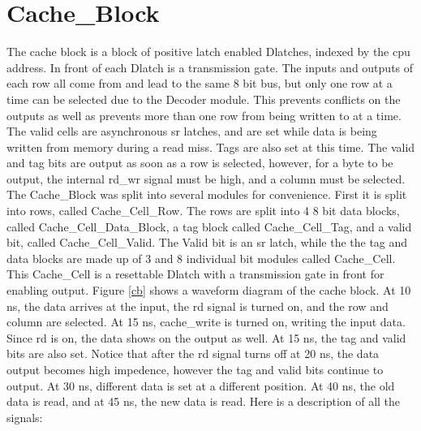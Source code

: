 \documentclass[10pt]{article}
\begin{document}
\section{Cache_Block}
The cache block is a block of positive latch enabled Dlatches, indexed by the
cpu address. In front of each Dlatch is a transmission gate. The inputs and
outputs of each row all come from and lead to the same 8 bit bus, but only one row at a time can
be selected due to the Decoder module. This prevents conflicts on the outputs as
well as prevents more than one row from being written to at a time. The valid
cells are asynchronous sr latches, and are set while data is being written from
memory during a read miss. Tags are also set at this time. The valid and tag
bits are output as soon as a row is selected, however, for a byte to be
output, the internal rd_wr signal must be high, and a column must be selected.
The Cache_Block was split into several modules for  convenience. First it is
split into rows, called Cache_Cell_Row. The rows are split into 4 8 bit data
blocks, called Cache_Cell_Data_Block, a tag block called Cache_Cell_Tag, and a
valid bit, called Cache_Cell_Valid. The Valid bit is an sr latch, while the the
tag and data blocks are made up of 3 and 8 individual bit modules called
Cache_Cell. This Cache_Cell is a resettable Dlatch with a transmission gate in
front for enabling output. Figure \ref{cb} shows a waveform diagram of the cache
block. At 10 ns, the data arrives at the input, the rd signal is turned on, and
the row and column are selected. At 15 ns, cache_write is turned on, writing the
input data. Since rd is on, the data shows on the output as well. At 15 ns, the
tag and valid bits are also set. Notice that after the rd signal turns off at 20
ns, the data output becomes high impedence, however the tag and valid bits
continue to output. At 30 ns, different data is set at a different position. At
40 ns, the old data is read, and at 45 ns, the new data is read. Here is a
description of all the signals:
\end{document}
